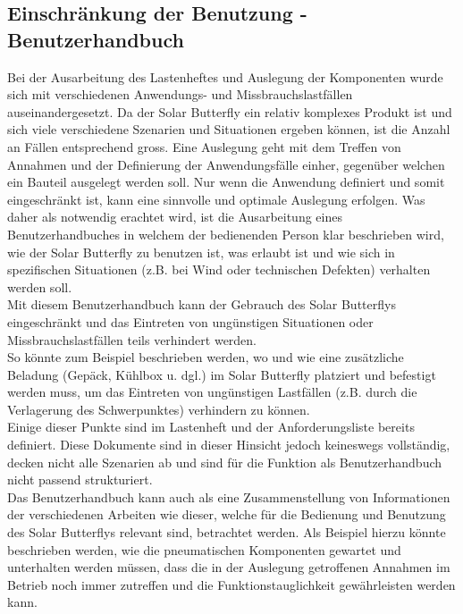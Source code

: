 
\subsection{Einschränkung der Benutzung - Benutzerhandbuch}
Bei der Ausarbeitung des Lastenheftes und Auslegung der Komponenten wurde sich mit verschiedenen Anwendungs- und Missbrauchslastfällen auseinandergesetzt. Da der Solar Butterfly ein relativ komplexes Produkt ist und sich viele verschiedene Szenarien und Situationen ergeben können, ist die Anzahl an Fällen entsprechend gross. Eine Auslegung geht mit dem Treffen von Annahmen und der Definierung der Anwendungsfälle einher, gegenüber welchen ein Bauteil ausgelegt werden soll. Nur wenn die Anwendung definiert und somit eingeschränkt ist, kann eine sinnvolle und optimale Auslegung erfolgen.
Was daher als notwendig erachtet wird, ist die Ausarbeitung eines \glqq Benutzerhandbuches\grqq{} in welchem der bedienenden Person klar beschrieben wird, wie der Solar Butterfly zu benutzen ist, was \glqq erlaubt\grqq{} ist und wie sich in spezifischen Situationen (z.B. bei Wind oder technischen Defekten) verhalten werden soll.\\
Mit diesem Benutzerhandbuch kann der Gebrauch des Solar Butterflys eingeschränkt und das Eintreten von ungünstigen Situationen oder Missbrauchslastfällen teils verhindert werden.\\
So könnte zum Beispiel beschrieben werden, wo und wie eine zusätzliche Beladung (Gepäck, Kühlbox u. dgl.) im Solar Butterfly platziert und befestigt werden muss, um das Eintreten von ungünstigen Lastfällen (z.B. durch die Verlagerung des Schwerpunktes) verhindern zu können.\\
Einige dieser Punkte sind im Lastenheft und der Anforderungsliste bereits definiert. Diese Dokumente sind in dieser Hinsicht jedoch keineswegs vollständig, decken nicht alle Szenarien ab und sind für die Funktion als Benutzerhandbuch nicht passend strukturiert.\\
Das Benutzerhandbuch kann auch als eine Zusammenstellung von Informationen der verschiedenen Arbeiten wie dieser, welche für die Bedienung und Benutzung des Solar Butterflys relevant sind, betrachtet werden.
Als Beispiel hierzu könnte beschrieben werden, wie die pneumatischen Komponenten gewartet und unterhalten werden müssen, dass die in der Auslegung getroffenen Annahmen im Betrieb noch immer zutreffen und die Funktionstauglichkeit gewährleisten werden kann.


